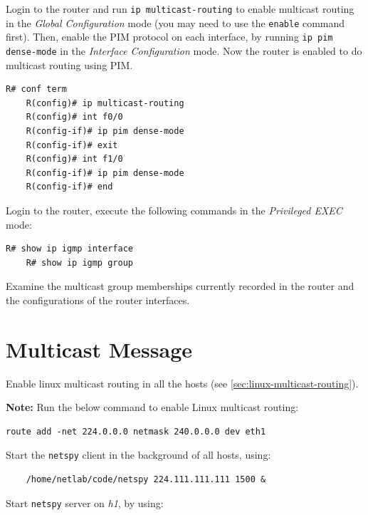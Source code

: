 \documentclass{UTNetLab}
\begin{document}
    Login to the router and run \lstinline{ip multicast-routing} to enable multicast routing in the \textit{Global Configuration} mode (you may need to use the \lstinline{enable} command first).
    Then, enable the PIM protocol on each interface, by running \lstinline{ip pim dense-mode} in the \textit{Interface Configuration} mode.
    Now the router is enabled to do multicast routing using PIM.

    \begin{lstlisting}[language=cisco]
	R# conf term
    R(config)# ip multicast-routing
    R(config)# int f0/0
    R(config-if)# ip pim dense-mode
    R(config-if)# exit
    R(config)# int f1/0
    R(config-if)# ip pim dense-mode
    R(config-if)# end
    \end{lstlisting}

    Login to the router, execute the following commands in the \textit{Privileged EXEC} mode:

    \begin{lstlisting}[language=cisco]
	R# show ip igmp interface
	R# show ip igmp group
    \end{lstlisting}

   Examine the multicast group memberships currently recorded in the router and the configurations of the router interfaces.


\section{Multicast Message}
    Enable linux multicast routing in all the hosts (see \autoref{sec:linux-multicast-routing}).
    
    \textbf{Note:} Run the below command to enable Linux multicast routing:
    
    \begin{lstlisting}[emph=eth0]
    route add -net 224.0.0.0 netmask 240.0.0.0 dev eth1
    \end{lstlisting}

    Start the \lstinline{netspy} client in the background of all hosts, using:

    \begin{lstlisting}
	/home/netlab/code/netspy 224.111.111.111 1500 &
    \end{lstlisting}
    Start \lstinline{netspy} server on \textit{h1}, by using:
\end{document}
